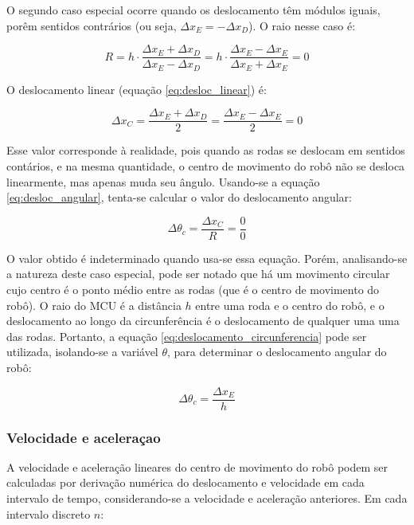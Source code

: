 O segundo caso especial ocorre quando os deslocamento têm módulos iguais, porêm sentidos contrários (ou seja, $\Delta x_E = - \Delta x_D$). O raio nesse caso é:

\begin{equation}
  R = h \cdot \frac{\Delta x_E + \Delta x_D} {\Delta x_E - \Delta x_D} = h \cdot \frac{\Delta x_E - \Delta x_E}{\Delta x_E + \Delta x_E} = 0
    \label{eq:caso_especial2_R}
\end{equation}


O deslocamento linear (equação \ref{eq:desloc_linear}) é:

\begin{equation}
  \Delta x_C = \frac{\Delta x_E + \Delta x_D}{2} = \frac{\Delta x_E - \Delta x_E}{2} = 0
  \label{eq:caso_especial2_x}
\end{equation}

Esse valor corresponde à realidade, pois quando as rodas se deslocam em sentidos contários, e na mesma quantidade, o centro de movimento do robô não se desloca linearmente, mas apenas muda seu ângulo.
Usando-se a equação \ref{eq:desloc_angular}, tenta-se calcular o valor do deslocamento angular:

\begin{equation}
  \Delta \theta_c = \frac{\Delta x_C}{R} = \frac{0}{0}
  \label{eq:caso_especial2_theta}
\end{equation}

O valor obtido é indeterminado quando usa-se essa equação. Porém, analisando-se a natureza deste caso especial, pode ser notado que há um movimento circular cujo centro é o ponto médio entre as rodas (que é o centro de movimento do robô). O raio do MCU é a distância $h$ entre uma roda e o centro do robô, e o deslocamento ao longo da circunferência é o deslocamento de qualquer uma uma das rodas. Portanto, a equação \ref{eq:deslocamento_circunferencia} pode ser utilizada, isolando-se a variável $\theta$, para determinar o deslocamento angular do robô:

\begin{equation}
  \Delta \theta_c = \frac{\Delta x_E}{h}
  \label{eq:caso_especial2_theta2}
\end{equation}


\subsubsection{Velocidade e aceleraçao}

A velocidade e aceleração lineares do centro de movimento do robô podem ser calculadas por derivação numérica do deslocamento e velocidade em cada intervalo de tempo, considerando-se a velocidade e aceleração anteriores. Em cada intervalo discreto $n$:

